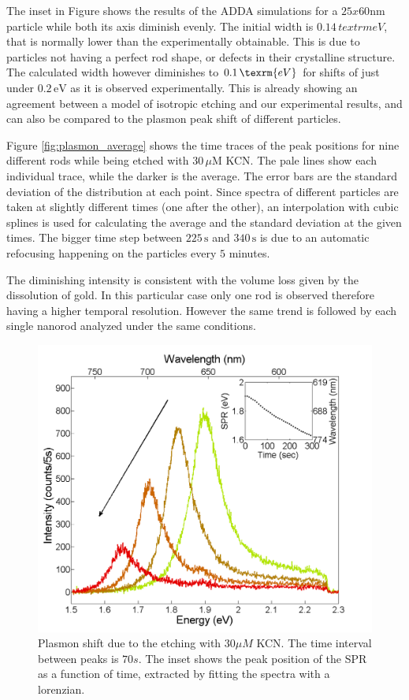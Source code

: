 \documentclass[twocolumn]{article}
\begin{document}
The inset in Figure  shows the results of the ADDA simulations
for a $25x60$nm particle while both its axis diminish evenly. The initial width
is $0.14\,textrm{eV}$, that is normally lower than the experimentally
obtainable. This is due to particles not having a perfect rod shape, or defects
in their crystalline structure. The calculated width however diminishes to
$0.1\,\texrm{eV}$ for shifts of just under $0.2\,\textrm{eV}$ as it is observed
experimentally. This is already showing an agreement between a model of
isotropic etching and our experimental results, and can also be compared to the
plasmon peak shift of different particles. 

Figure \ref{fig:plasmon_average} shows the time traces of the peak positions for
nine different rods while being etched with $30\,\mu\textrm{M}$ KCN. The pale
lines show each individual trace, while the darker is the average.
The error bars are the standard deviation of the distribution at each point.
Since spectra of different particles are taken at slightly different times (one
after the other), an interpolation with cubic splines is used for calculating
the average and the standard deviation at the given times. The bigger time step
between $225\,\textrm{s}$ and $340\,\textrm{s}$ is due to an automatic
refocusing happening on the particles every $5$ minutes.

The diminishing intensity is consistent
with the volume loss given by the dissolution of gold.
In this particular case only one rod is observed therefore having a higher
temporal resolution. However the same trend is followed by each single nanorod
analyzed under the same conditions.


\begin{figure}[tp]
 \centering
 \includegraphics[width=0.95\linewidth]{plasmon_single_rod.png}
 \caption{Plasmon shift due to the etching with $30\mu M$ KCN. The time
 interval between peaks is $70s$. The inset shows the peak position of the SPR as a
 function of time, extracted by fitting the spectra with a lorenzian.}
 \label{fig:plasmon_single_rod}
\end{figure}
\end{document}
